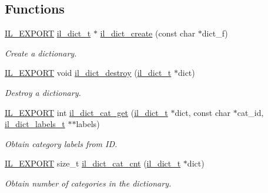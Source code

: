 \subsection*{Functions}
\begin{DoxyCompactItemize}
\item 
\hyperlink{common_8h_a6bb629d26c52bfe10519ba3176853f47}{I\+L\+\_\+\+E\+X\+P\+O\+RT} \hyperlink{group__IL__DICT_gac2cb8ba7974d8506df3017879572fc84}{il\+\_\+dict\+\_\+t} $\ast$ \hyperlink{group__IL__DICT_gaf3d1da6ffb1d4efcf40946dc705230f2}{il\+\_\+dict\+\_\+create} (const char $\ast$dict\+\_\+f)
\begin{DoxyCompactList}\small\item\em Create a dictionary. \end{DoxyCompactList}\item 
\hyperlink{common_8h_a6bb629d26c52bfe10519ba3176853f47}{I\+L\+\_\+\+E\+X\+P\+O\+RT} void \hyperlink{group__IL__DICT_ga37cc4ceb38514581a5bbecb47f5cfa61}{il\+\_\+dict\+\_\+destroy} (\hyperlink{group__IL__DICT_gac2cb8ba7974d8506df3017879572fc84}{il\+\_\+dict\+\_\+t} $\ast$dict)
\begin{DoxyCompactList}\small\item\em Destroy a dictionary. \end{DoxyCompactList}\item 
\hyperlink{common_8h_a6bb629d26c52bfe10519ba3176853f47}{I\+L\+\_\+\+E\+X\+P\+O\+RT} int \hyperlink{group__IL__DICT_ga3ea660af3316835c1799ce8dca67b566}{il\+\_\+dict\+\_\+cat\+\_\+get} (\hyperlink{group__IL__DICT_gac2cb8ba7974d8506df3017879572fc84}{il\+\_\+dict\+\_\+t} $\ast$dict, const char $\ast$cat\+\_\+id, \hyperlink{group__IL__DICT__LABELS_ga69d1109256f465cbcfa8aac7fa592495}{il\+\_\+dict\+\_\+labels\+\_\+t} $\ast$$\ast$labels)
\begin{DoxyCompactList}\small\item\em Obtain category labels from ID. \end{DoxyCompactList}\item 
\hyperlink{common_8h_a6bb629d26c52bfe10519ba3176853f47}{I\+L\+\_\+\+E\+X\+P\+O\+RT} size\+\_\+t \hyperlink{group__IL__DICT_gac982efe51c1ceca824b89b729397bf6f}{il\+\_\+dict\+\_\+cat\+\_\+cnt} (\hyperlink{group__IL__DICT_gac2cb8ba7974d8506df3017879572fc84}{il\+\_\+dict\+\_\+t} $\ast$dict)
\begin{DoxyCompactList}\small\item\em Obtain number of categories in the dictionary. \end{DoxyCompactList}\item 
$$
\end{DoxyCompactItemize}

